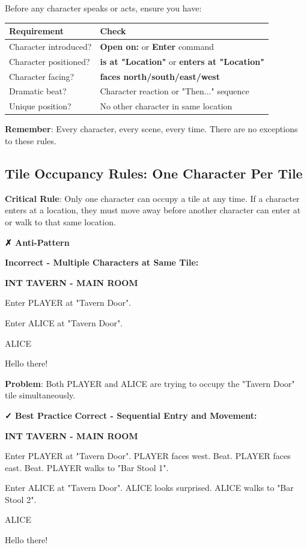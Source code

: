 \documentclass[11pt,letterpaper,oldstylefigures]{memoir}
\newcommand{\slugline}[1]{\nobreak\textbf{\MakeUppercase{#1}}\par\nobreak\vspace{1\baselineskip}}
\newcommand{\speaker}[1]{\nobreak\hspace*{0.333\textwidth}\MakeUppercase{#1}\par\nobreak\vspace{0.5\baselineskip}}
\newcommand{\dialogue}[1]{\nobreak\hspace*{0.25\textwidth}\begin{minipage}{0.5\textwidth}#1\end{minipage}\par\vspace{1\baselineskip}}
\newcommand{\stagedir}[1]{#1\par\vspace{1\baselineskip}}
\newenvironment{FountainExample}
  {\begingroup
  \ttfamily\small
   \setlength{\parindent}{0pt}
  \setlength{\parskip}{0.5em}
  \allowdisplaybreaks
  \setlength{\displaywidowpenalty}{0}
  \setlength{\widowpenalty}{0}
  \setlength{\clubpenalty}{0}
  \setlength{\interlinepenalty}{0}
}
  {\endgroup}
\newenvironment{AntiPattern}
{\begingroup
\small
\setlength{\parindent}{0pt}
\setlength{\parskip}{0.5em}
\allowdisplaybreaks
\setlength{\displaywidowpenalty}{0}
\setlength{\widowpenalty}{0}
\setlength{\clubpenalty}{0}
\setlength{\interlinepenalty}{0}
\begin{tcolorbox}[
    colback=red!5,
    colframe=red!75!black,
    boxrule=0.5pt,
    arc=2pt,
    left=0.5em,
    right=0.5em,
    top=0.25em,
    bottom=0.25em
]
\textbf{✗ Anti-Pattern}
\end{tcolorbox}\par
}
{\endgroup}
\newcommand{\fountain}[1]{\textbf{#1}}
\begin{document}
Before any character speaks or acts, ensure you have:

\begin{center}
\begin{tabular}{|l|l|}
\hline
\textbf{Requirement} & \textbf{Check} \\
\hline
Character introduced? & \fountain{Open on:} or \fountain{Enter} command \\
Character positioned? & \fountain{is at "Location"} or \fountain{enters at "Location"} \\
Character facing? & \fountain{faces north/south/east/west} \\
Dramatic beat? & Character reaction or "Then..." sequence \\
Unique position? & No other character in same location \\
\hline
\end{tabular}
\end{center}

\textbf{Remember}: Every character, every scene, every time. There are no exceptions to these rules.

\subsection{Tile Occupancy Rules: One Character Per Tile}

\textbf{Critical Rule}: Only one character can occupy a tile at any time. If a character enters at a location, they must move away before another character can enter at or walk to that same location.

\begin{AntiPattern}
\textbf{Incorrect - Multiple Characters at Same Tile:}
\begin{FountainExample}
\slugline{INT TAVERN - MAIN ROOM}

\stagedir{Enter PLAYER at "Tavern Door".}
\stagedir{Enter ALICE at "Tavern Door".}

\speaker{ALICE}
\dialogue{Hello there!}
\end{FountainExample}

\textbf{Problem}: Both PLAYER and ALICE are trying to occupy the "Tavern Door" tile simultaneously.
\end{AntiPattern}

\textbf{✓ Best Practice}
\textbf{Correct - Sequential Entry and Movement:}
\begin{FountainExample}
\slugline{INT TAVERN - MAIN ROOM}

\stagedir{Enter PLAYER at "Tavern Door". PLAYER faces west. Beat. PLAYER faces east. Beat. PLAYER walks to "Bar Stool 1".}
\stagedir{Enter ALICE at "Tavern Door". ALICE looks surprised. ALICE walks to "Bar Stool 2".}

\speaker{ALICE}
\dialogue{Hello there!}
\end{FountainExample}
\end{document}
